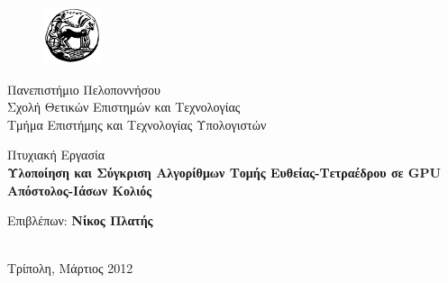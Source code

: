 
\begin{titlepage}

\begin{figure}
\vspace*{-11pt}
\includegraphics[width=0.15\textwidth]{./graphics/uoplogo.png}  
\end{figure}

\noindent Πανεπιστήμιο Πελοποννήσου\\
Σχολή Θετικών Επιστημών και Τεχνολογίας\\
Τμήμα Επιστήμης και Τεχνολογίας Υπολογιστών\\[3cm]

\vspace*{-10pt}

\begin{center}

{\LARGE {\noindent Πτυχιακή Εργασία}\\[2.5cm]

{\bf Υλοποίηση και Σύγκριση Αλγορίθμων Τομής Ευθείας-Τετραέδρου σε GPU\\[4cm]

Απόστολος-Ιάσων Κολιός}}\\[5cm]

\begin{Large}Επιβλέπων: {\bf Νίκος Πλατής}\end{Large}\\[3cm]

Τρίπολη, Μάρτιος 2012\\

\vfill
\end{center}
\end{titlepage}
